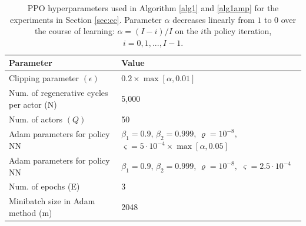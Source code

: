 \documentclass[11pt]{article}
\theoremstyle{definition}
\numberwithin{equation}{section}
\begin{document}
\begin{table}[H]
\centering%
\begin{tabular}{l|@{\quad}l}
  \hline
  Parameter  & Value\\\hline
   Clipping parameter  $(\epsilon)$ & $0.2\times \max[ \alpha,0.01]$ \\
  Num. of regenerative cycles per actor (N) & 5,000 \\
  Num. of  actors $(Q)$  & 50 \\
  Adam parameters for policy NN& $\beta_1 = 0.9$, $\beta_2 = 0.999$, $\varrho = 10^{-8},$  $\varsigma=5\cdot 10^{-4}\times \max[ \alpha,0.05]  $   \\
  Adam parameters for policy NN& $\beta_1 = 0.9$, $\beta_2 = 0.999$, $\varrho = 10^{-8},$  $\varsigma=2.5\cdot 10^{-4}  $ \\
  Num. of epochs (E) & 3\\
  Minibatch size in Adam method (m) & 2048\\
\end{tabular}
\caption[]{PPO hyperparameters used in Algorithm \ref{alg1} and \ref{alg1amp} for the experiments in Section \ref{sec:cc}.  Parameter $\alpha$ decreases linearly  from $1$ to $0$ over the course of learning: $\alpha =(I - i)/I$ on the $i$th policy iteration, $i=0, 1,...,I-1. $  }\label{tab:par1}
\end{table}
\end{document}

